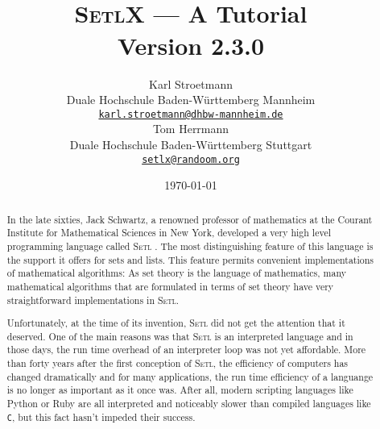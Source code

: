 \documentclass[twoside]{report}
\title{\vspace*{-1cm}
  \epsfig{file=aleph0,scale=0.21} \\[0.5cm]
\textsc{SetlX} --- A Tutorial \\[0.5cm]
Version 2.3.0
}
\author{Karl Stroetmann \\[0.2cm]
Duale Hochschule Baden-W\"urttemberg Mannheim \\[0.2cm]
\href{mailto:karl.stroetmann@dhbw-mannheim.de}{\texttt{karl.stroetmann@dhbw-mannheim.de}} \\[0.5cm]
 Tom Herrmann  \\[0.2cm]
Duale Hochschule Baden-W\"urttemberg Stuttgart \\[0.2cm]
\href{mailto:setlx@randoom.org}{\texttt{setlx@randoom.org}}
}
\date{\today}
\begin{document}
\maketitle

\begin{abstract}
  In the late sixties, Jack Schwartz, a renowned professor of mathematics at the Courant Institute for
Mathematical Sciences in New York, developed a very high level programming language called
\textsc{Setl} 
\cite{schwartz:1970, setl86}.  The most distinguishing feature of this language is the
support it offers for sets and lists.   This feature permits convenient implementations of
mathematical algorithms:  As set theory is the language of mathematics, many mathematical
algorithms that are formulated in terms of set theory have very straightforward implementations in
\textsc{Setl}. 

Unfortunately, at the time of its invention, \textsc{Setl} did not get the attention that it deserved.
One of the main reasons was that \textsc{Setl} is an interpreted language and in those
days, the run time overhead of an interpreter loop was not yet affordable.  More than
forty years after the first conception of \textsc{Setl}, the efficiency of computers has changed
dramatically and for many applications, the run time efficiency of a languange is no
longer as important as it once was.  After all, 
modern scripting languages like Python \cite{vanRossum:95} or Ruby \cite{flanagan:2008}
are all interpreted and noticeably slower than compiled languages like \texttt{C}, but this
fact hasn't impeded their success. 


\end{abstract}
\end{document}
